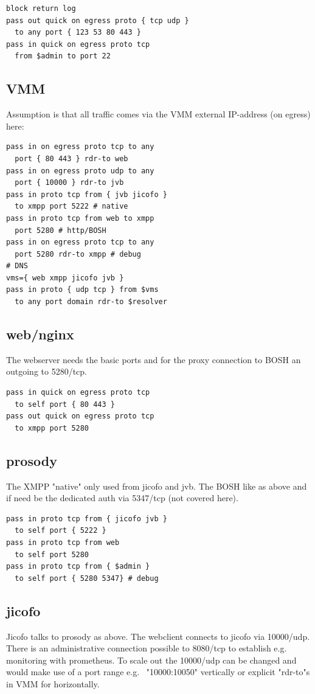 \documentclass[10pt,conference]{IEEEtran}
\begin{document}
\begin{verbatim}
block return log
pass out quick on egress proto { tcp udp }
  to any port { 123 53 80 443 }
pass in quick on egress proto tcp
  from $admin to port 22
\end{verbatim}

\subsection{VMM}
Assumption is that all traffic comes via the VMM external IP-address (on egress) here:

\begin{verbatim}
pass in on egress proto tcp to any
  port { 80 443 } rdr-to web
pass in on egress proto udp to any
  port { 10000 } rdr-to jvb
pass in proto tcp from { jvb jicofo }
  to xmpp port 5222 # native
pass in proto tcp from web to xmpp
  port 5280 # http/BOSH
pass in on egress proto tcp to any
  port 5280 rdr-to xmpp # debug
# DNS
vms={ web xmpp jicofo jvb }
pass in proto { udp tcp } from $vms
  to any port domain rdr-to $resolver
\end{verbatim}

\subsection{web/nginx}
The webserver needs the basic ports and for the proxy connection to BOSH an outgoing
to 5280/tcp.

\begin{verbatim}
pass in quick on egress proto tcp
  to self port { 80 443 }
pass out quick on egress proto tcp
  to xmpp port 5280
\end{verbatim}

\subsection{prosody}
The XMPP "native" only used from jicofo and jvb. The BOSH like as above and if need be
the dedicated auth via 5347/tcp (not covered here).

\begin{verbatim}
pass in proto tcp from { jicofo jvb }
  to self port { 5222 }
pass in proto tcp from web
  to self port 5280
pass in proto tcp from { $admin }
  to self port { 5280 5347} # debug
\end{verbatim}

\subsection{jicofo}
Jicofo talks to prosody as above. The webclient connects to jicofo via 10000/udp. There
is an administrative connection possible to 8080/tcp to establish e.g. monitoring with
prometheus.
To scale out the 10000/udp can be changed and would make use of a port range e.g. 
"10000:10050" vertically or explicit "rdr-to"s in VMM for horizontally.
\end{document}
